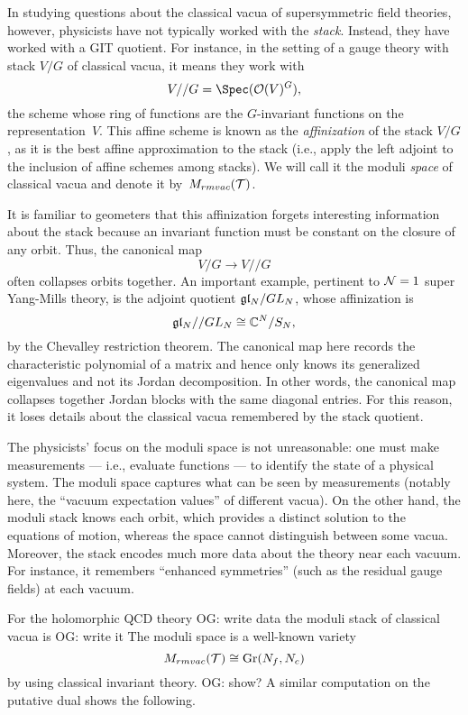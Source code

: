 \documentclass[11pt]{amsart}
\def\owen#1{{\textcolor{violet!65!black}{OG: {#1}}}}
\begin{document}
In studying questions about the classical vacua of supersymmetric field theories, however, physicists have not typically worked with the {\em stack}.
Instead, they have worked with a GIT quotient.
For instance, in the setting of a gauge theory with stack $V/G$ of classical vacua, it means they work with
\[
V//G = \Spec(\cO(V)^G),
\]
the scheme whose ring of functions are the $G$-invariant functions on the representation~$V$.
This affine scheme is known as the {\em affinization} of the stack $V/G$, as it is the best affine approximation to the stack (i.e., apply the left adjoint to the inclusion of affine schemes among stacks).
We will call it the moduli {\em space} of classical vacua and denote it by~$M_{rm vac}(\mathcal T)$.

It is familiar to geometers that this affinization forgets interesting information about the stack because an invariant function must be constant on the closure of any orbit.
Thus, the canonical map
\[
V/G \to V//G
\]
often collapses orbits together.
An important example, pertinent to $\mathcal N =1$ super Yang-Mills theory, is the adjoint quotient $\mathfrak{g} \mathfrak{l}_N/ GL_N$, whose affinization is
\[
\mathfrak{g} \mathfrak{l}_N//GL_N \cong \mathbb C^N/S_N,
\]
by the Chevalley restriction theorem.
The canonical map here records the characteristic polynomial of a matrix and hence only knows its generalized eigenvalues and not its Jordan decomposition.
In other words, the canonical map collapses together Jordan blocks with the same diagonal entries.
For this reason, it loses details about the classical vacua remembered by the stack quotient.

\begin{rmk}
The physicists' focus on the moduli space is not unreasonable:
one must make measurements --- i.e., evaluate functions --- to identify the state of a physical system.
The moduli space captures what can be seen by measurements (notably here, the ``vacuum expectation values'' of different vacua).
On the other hand, the moduli stack knows each orbit, which provides a distinct solution to the equations of motion, whereas the space cannot distinguish between some vacua.
Moreover, the stack encodes much more data about the theory near each vacuum.
For instance, it remembers ``enhanced symmetries'' (such as the residual gauge fields) at each vacuum.
\end{rmk}

For the holomorphic QCD theory \owen{write data} the moduli stack of classical vacua is \owen{write it}
The moduli space is a well-known variety
\[
M_{rm vac}(\mathcal T) \cong {\rm Gr}(N_f, N_c)
\]
by using classical invariant theory. \owen{show?}
A similar computation on the putative dual shows the following.
\end{document}
